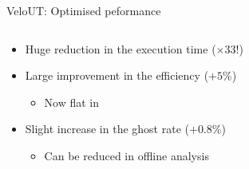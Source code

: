 \documentclass[aspectratio=1610]{beamer}
\begin{document}
\begin{frame}{VeloUT: Optimised peformance}

\begin{columns}
\begin{column}{0.65\textwidth}
\begin{itemize}
  \item Huge reduction in the execution time ($\times$33!)
  \item Large improvement in the efficiency ($+5$\%)
  \begin{itemize}
    \item[\ding{70}] Now flat in \ptot
  \end{itemize}
  \item Slight increase in the ghost rate ($+0.8$\%)
  \begin{itemize}
    \item[\ding{70}] Can be reduced in offline analysis
  \end{itemize}
\end{itemize}

\bigskip

\begin{mdframed}[linecolor=barcolor]
\begin{center}
\end{center}
\end{mdframed}
\end{column}


\end{columns}
\end{frame}
\end{document}
